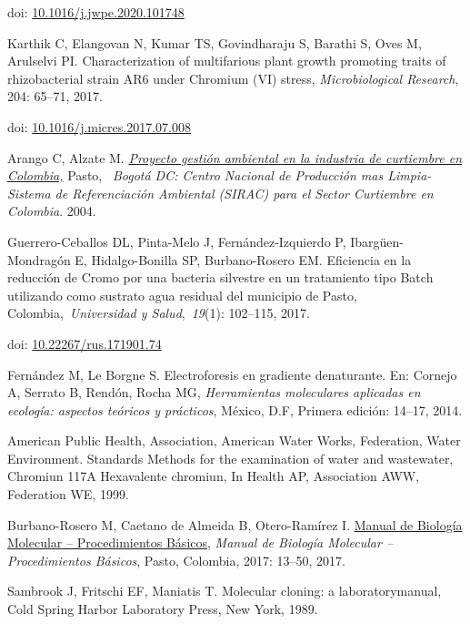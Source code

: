\begin{thebibliography}{99}
doi: \href{https://doi.org/10.1016/j.jwpe.2020.101748}{10.1016/j.jwpe.2020.101748}

 Karthik C, Elangovan N, Kumar TS, Govindharaju S, Barathi S,
Oves M, Arulselvi PI. Characterization of multifarious plant growth
promoting traits of rhizobacterial strain AR6 under Chromium (VI)
stress, \emph{Microbiological Research}, 204: 65--71, 2017.

doi: \href{https://doi.org/10.1016/j.micres.2017.07.008}{10.1016/j.micres.2017.07.008}

 Arango C, Alzate M.
\href{http://www.icesi.edu.co/blogs/gestionintegralindustrial/files/2011/10/SIRAC-Curtiembres.pdf}{\emph{Proyecto gestión ambiental en la industria de curtiembre en Colombia,}}
Pasto, ~\emph{Bogotá DC: Centro Nacional de Producción mas Limpia-Sistema de Referenciación Ambiental (SIRAC) para el Sector Curtiembre en Colombia}. 2004.

 Guerrero-Ceballos DL, Pinta-Melo J, Fernández-Izquierdo P,
Ibargüen-Mondragón E, Hidalgo-Bonilla SP, Burbano-Rosero EM. Eficiencia
en la reducción de Cromo por una bacteria silvestre en un tratamiento
tipo Batch utilizando como sustrato agua residual del municipio de
Pasto, Colombia,~\emph{Universidad y Salud},~\emph{19}(1): 102--115, 2017.

doi: \href{http://dx.doi.org/10.22267/rus.171901.74}{10.22267/rus.171901.74}

 Fernández M, Le Borgne S. Electroforesis en gradiente
denaturante. En: Cornejo A, Serrato B, Rendón, Rocha MG,
\emph{Herramientas moleculares aplicadas en ecología: aspectos teóricos
y prácticos}, México, D.F, Primera edición: 14--17, 2014.

 American Public Health, Association, American Water Works,
Federation, Water Environment. Standards Methods for the examination of
water and wastewater, Chromiun 117A Hexavalente chromiun, In Health AP,
Association AWW, Federation WE, 1999.

 Burbano-Rosero M, Caetano de Almeida B, Otero-Ramírez I.
\href{https://www.researchgate.net/profile/Edith_Burbano-Rosero/publication/326905291_Manual_de_Biologia_Molecular-Procedimientos_Basicos/links/5b7de35292851c1e12291a22/Manual-de-Biologia-Molecular-Procedimientos-Basicos.pdf}{Manual de Biología Molecular -- Procedimientos Básicos}, \emph{Manual de Biología Molecular -- Procedimientos Básicos}, Pasto, Colombia, 2017: 13--50, 2017.

 Sambrook J, Fritschi EF, Maniatis T. Molecular cloning: a
laboratorymanual, Cold Spring Harbor Laboratory Press, New York, 1989.


\end{thebibliography}
